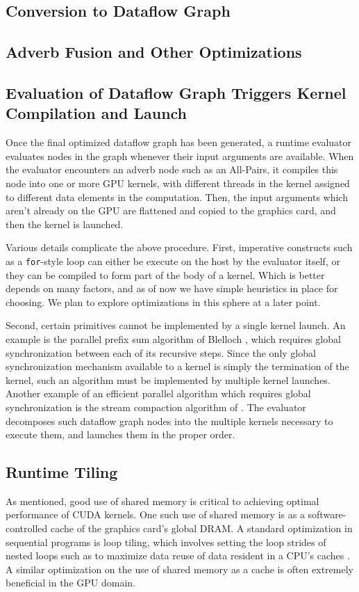 \documentclass[preprint]{sigplanconf}
\begin{document}
\subsection{Conversion to Dataflow Graph}


\subsection{Adverb Fusion and Other Optimizations}


\subsection{Evaluation of Dataflow Graph Triggers Kernel Compilation and Launch}
Once the final optimized dataflow graph has been generated, a runtime evaluator evaluates nodes in the graph whenever their input arguments are available.  When the evaluator encounters an adverb node such as an All-Pairs, it compiles this node into one or more GPU kernels, with different threads in the kernel assigned to different data elements in the computation.  Then, the input arguments which aren't already on the GPU are flattened and copied to the graphics card, and then the kernel is launched.

Various details complicate the above procedure.  First, imperative constructs such as a \texttt{for}-style loop can either be execute on the host by the evaluator itself, or they can be compiled to form part of the body of a kernel.  Which is better depends on many factors, and as of now we have simple heuristics in place for choosing.  We plan to explore optimizations in this sphere at a later point.

Second, certain primitives cannot be implemented by a single kernel launch.  An example is the parallel prefix sum algorithm of Blelloch \cite{Blel90}, which requires global synchronization between each of its recursive steps.  Since the only global synchronization mechanism available to a kernel is simply the termination of the kernel, such an algorithm must be implemented by multiple kernel launches.  Another example of an efficient parallel algorithm which requires global synchronization is the stream compaction algorithm of \cite{Bill09}.  The evaluator decomposes such dataflow graph nodes into the multiple kernels necessary to execute them, and launches them in the proper order.

\subsection{Runtime Tiling}
As mentioned, good use of shared memory is critical to achieving optimal performance of CUDA kernels.  One such use of shared memory is as a software-controlled cache of the graphics card's global DRAM.  A standard optimization in sequential programs is loop tiling, which involves setting the loop strides of nested loops such as to maximize data reuse of data resident in a CPU's caches \cite{Wolf91}.  A similar optimization on the use of shared memory as a cache is often extremely beneficial in the GPU domain.
\end{document}
